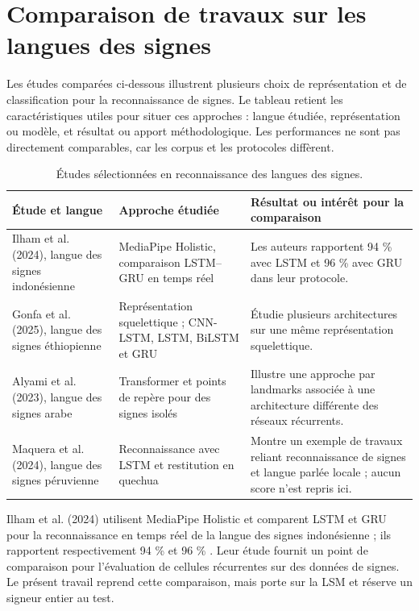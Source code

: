 \section{Comparaison de travaux sur les langues des signes}

Les études comparées ci-dessous illustrent plusieurs choix de représentation et de classification pour la reconnaissance de signes. Le tableau retient les caractéristiques utiles pour situer ces approches : langue étudiée, représentation ou modèle, et résultat ou apport méthodologique. Les performances ne sont pas directement comparables, car les corpus et les protocoles diffèrent.

\begin{table}[ht]
\centering
\small
\caption{Études sélectionnées en reconnaissance des langues des signes.}
\label{tab:comparaison-travaux-ls}
\begin{tabular}{|p{3.0cm}|p{4.3cm}|p{6.0cm}|}
\hline
Étude et langue & Approche étudiée & Résultat ou intérêt pour la comparaison \\
\hline
Ilham et al. (2024), langue des signes indonésienne \cite{Ilham2024Indonesian} & MediaPipe Holistic, comparaison LSTM--GRU en temps réel & Les auteurs rapportent 94 \% avec LSTM et 96 \% avec GRU dans leur protocole. \\
\hline
Gonfa et al. (2025), langue des signes éthiopienne \cite{Gonfa2025Ethiopian} & Représentation squelettique ; CNN-LSTM, LSTM, BiLSTM et GRU & Étudie plusieurs architectures sur une même représentation squelettique. \\
\hline
Alyami et al. (2023), langue des signes arabe \cite{Alyami2023Arabic} & Transformer et points de repère pour des signes isolés & Illustre une approche par landmarks associée à une architecture différente des réseaux récurrents. \\
\hline
Maquera et al. (2024), langue des signes péruvienne \cite{Maquera2024LSP} & Reconnaissance avec LSTM et restitution en quechua & Montre un exemple de travaux reliant reconnaissance de signes et langue parlée locale ; aucun score n'est repris ici. \\
\hline
\end{tabular}
\end{table}

Ilham et al. (2024) utilisent MediaPipe Holistic et comparent LSTM et GRU pour la reconnaissance en temps réel de la langue des signes indonésienne ; ils rapportent respectivement 94 \% et 96 \% \cite{Ilham2024Indonesian}. Leur étude fournit un point de comparaison pour l'évaluation de cellules récurrentes sur des données de signes. Le présent travail reprend cette comparaison, mais porte sur la LSM et réserve un signeur entier au test.

